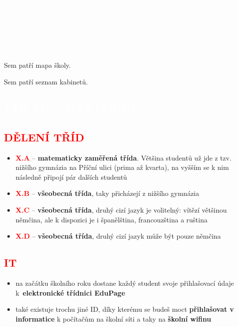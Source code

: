 \documentclass{article}
\newcommand{\nadpis}[1]{
  \vspace*{-60pt}
  \begin{nadpisbox}
    \vspace*{20pt}
    \centering \section*{\textcolor{white}{#1}}
  \end{nadpisbox}
}
\newcommand{\podnadpis}[1]{
  \subsection*{\textcolor{red}{#1}}
}
\begin{document}
\begin{titlepage}
  \pagecolor{red}
    \begin{center}
      \vspace*{\fill}

      \textcolor{white}{\fontsize{60}{60} \Kapitan Průvodce\\\vspace{0.2em}prváka}

      \vspace*{\fill}
      \textcolor{white}{\fontsize{20}{20} \Kapitan Jaroška}

      \vspace{0.5em}

      \begin{bluebox}
        \centering \fontsize{15}{15} \Kapitan \textcolor{white}{2024/2025}
      \end{bluebox}

      \vspace{3em}

    \end{center}
\end{titlepage}
\pagecolor{white}


Sem patří mapa školy.
\newpage

Sem patří seznam kabinetů.
\newpage

\nadpis{JAK TO U NÁS CHODÍ}
\noindent \podnadpis{DĚLENÍ TŘÍD}
\begin{itemize}[leftmargin=10pt]
  \item \textcolor{red}{\textbf{X.A}} --  \textbf{matematicky zaměřená třída}. Většina studentů už jde z tzv. nižšího gymnázia na Příční ulici (prima až kvarta), na vyšším se k nim následně připojí pár dalších studentů
  \item \textcolor{red}{\textbf{X.B}} -- \textbf{všeobecná třída}, taky přicházejí z nižšího gymnázia
  \item \textcolor{red}{\textbf{X.C}} -- \textbf{všeobecná třída}, druhý cizí jazyk je volitelný: vítězí většinou němčina, ale
k dispozici je i španělština, francouzština a ruština
  \item \textcolor{red}{\textbf{X.D}} -- \textbf{všeobecná třída}, druhý cizí jazyk může být pouze němčina
\end{itemize}
\podnadpis{IT}
\begin{itemize}[leftmargin=10pt]
  \item na začátku školního roku dostane každý student svoje přihlašovací údaje k~\textbf{elektronické třídnici EduPage}
  \item také existuje trochu jiné ID, díky kterému se budeš moct \textbf{přihlašovat v informatice} k počítačům na školní síti a taky na \textbf{školní wifinu}
\end{itemize}
\end{document}
